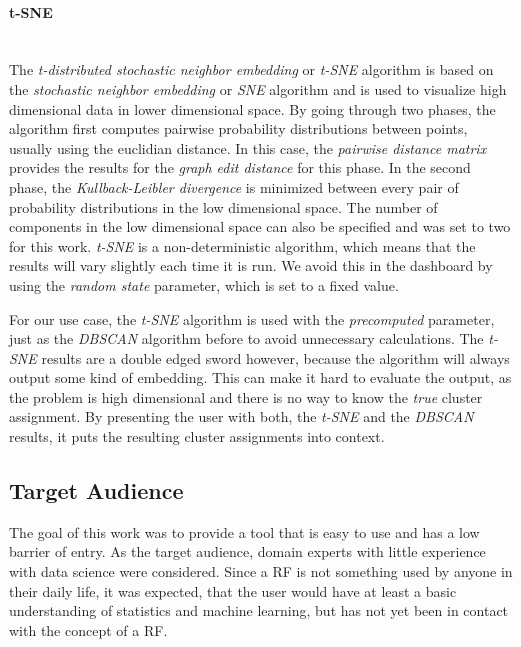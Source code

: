 \documentclass[a4paper, 12pt]{article}
\begin{document}
\paragraph{t-SNE}\mbox{}\\
The \textit{t-distributed stochastic neighbor embedding} or \textit{t-SNE} algorithm is based on
the \textit{stochastic neighbor embedding} or \textit{SNE} \cite{hinton2002stochastic} algorithm
and is used to visualize high dimensional data in lower dimensional space. By going through two
phases, the algorithm first computes pairwise probability distributions between points, usually
using the euclidian distance. In this case, the \textit{pairwise distance matrix} provides the
results for the \textit{graph edit distance} for this phase. In the second phase, the
\textit{Kullback-Leibler divergence} \cite{csiszar1975divergence} is minimized between every pair
of probability distributions in the low dimensional space. The number of components in the low
dimensional space can also be specified and was set to two for this work.
\textit{t-SNE} is a non-deterministic algorithm, which means that the results will vary slightly
each time it is run. We avoid this in the dashboard by using the \textit{random state} parameter,
which is set to a fixed value. \par

For our use case, the \textit{t-SNE} algorithm is used with the \textit{precomputed} parameter,
just as the \textit{DBSCAN} algorithm before to avoid unnecessary calculations.
The \textit{t-SNE} results are a double edged sword however, because the algorithm will always
output some kind of embedding. This can make it hard to evaluate the output, as the problem is
high dimensional and there is no way to know the \textit{true} cluster assignment.
By presenting the user with both, the \textit{t-SNE} and the \textit{DBSCAN} results, it puts the
resulting cluster assignments into context.

\subsection{Target Audience}
The goal of this work was to provide a tool that is easy to use and has a low barrier of entry.
As the target audience, domain experts with little experience with data science were considered.
Since a RF is not something used by anyone in their daily life, it was expected, that the user
would have at least a basic understanding of statistics and machine learning, but has not yet
been in contact with the concept of a RF. \par
\end{document}
